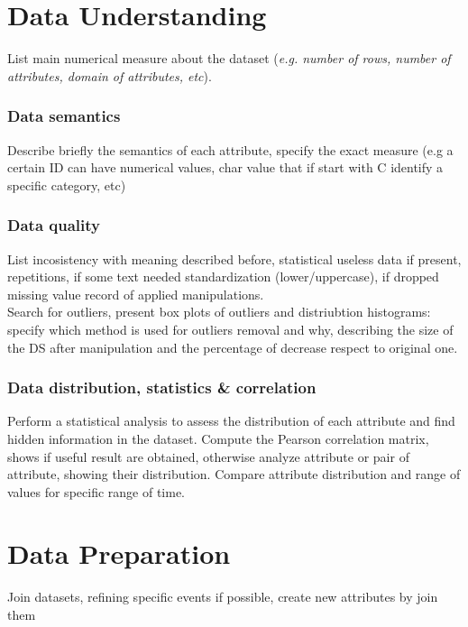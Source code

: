 \documentclass[10pt,a4paper]{report}
\begin{document}
	\clearpage
	
	
	\tableofcontents


\chapter{Data Understanding}
List main numerical measure about the dataset (\textit{e.g. number of rows, number of attributes, domain of attributes, etc}).

\subsection{Data semantics}
Describe briefly the semantics of each attribute, specify the exact measure (e.g a certain ID can have numerical values, char value that if start with C identify a specific category, etc)
\subsection{Data quality}
List incosistency with meaning described before, statistical useless data if present, repetitions, if some text needed standardization (lower/uppercase), if dropped missing value record of applied manipulations.\\
Search for outliers, present box plots of outliers and distriubtion histograms: specify which method is used for outliers removal and why, describing the size of the DS after manipulation and the percentage of decrease respect to original one. \\
 
\subsection{Data distribution, statistics \& correlation}
Perform a statistical analysis to assess the distribution of each attribute and find hidden information in the dataset. Compute the Pearson correlation matrix, shows if useful result are obtained, otherwise analyze attribute or pair of attribute, showing their distribution.
Compare attribute distribution and range of values for specific range of time.
 


\chapter{Data Preparation}
Join datasets, refining specific events if possible, create new attributes by join them
\end{document}
